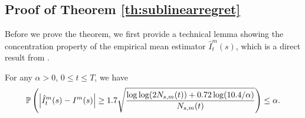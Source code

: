 \subsection{Proof of Theorem \ref{th:sublinearregret}}
\regretbound*
Before we prove the theorem, we first provide a technical lemma showing the concentration property of the empirical mean estimator $\hat{I}_t^m(s)$, which is a direct result from \citealt{10.1214/20-AOS1991}.
\begin{lemma}\label{le:concentration-empirical}
    For any $\alpha>0$, $0\leq t\leq T$, we have
    \begin{equation*}
        \mathbb{P}\left(\left|\hat{I}_t^m(s)-I^m(s)\right|\geq 1.7\sqrt{\frac{\log\log(2N_{s,m}(t))+0.72\log(10.4/\alpha)}{N_{s,m}(t)}}\right)\leq \alpha.
    \end{equation*}
\end{lemma}
